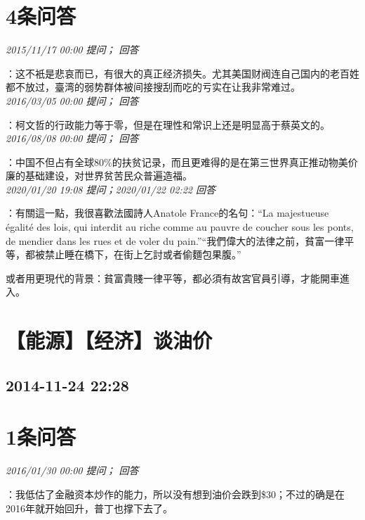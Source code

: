\documentclass[twocolumn]{ctexart}
\begin{document}
\section{4条问答}

\textit{\hfill\noindent\small 2015/11/17 00:00 提问； 回答}

：这不衹是悲哀而已，有很大的真正经济损失。尤其美国财阀连自己国内的老百姓都不放过，臺湾的弱势群体被间接搜刮而吃的亏实在让我非常难过。\\

\textit{\hfill\noindent\small 2016/03/05 00:00 提问； 回答}

：柯文哲的行政能力等于零，但是在理性和常识上还是明显高于蔡英文的。\\

\textit{\hfill\noindent\small 2016/08/08 00:00 提问； 回答}

：中国不但占有全球80\%的扶贫记录，而且更难得的是在第三世界真正推动物美价廉的基础建设，对世界贫苦民众普遍造福。\\

\textit{\hfill\noindent\small 2020/01/20 19:08 提问；2020/01/22 02:22 回答}

：有關這一點，我很喜歡法國詩人Anatole France的名句：“La majestueuse égalité des lois, qui interdit au riche comme au pauvre de coucher sous les ponts, de mendier dans les rues et de voler du pain.”“我們偉大的法律之前，貧富一律平等，都被禁止睡在橋下，在街上乞討或者偷麵包果腹。”

或者用更現代的背景：貧富貴賤一律平等，都必須有故宮官員引導，才能開車進入。
\\


\section{【能源】【经济】谈油价}
\subsection{2014-11-24 22:28}


\section{1条问答}

\textit{\hfill\noindent\small 2016/01/30 00:00 提问； 回答}

：我低估了金融资本炒作的能力，所以没有想到油价会跌到\$30；不过的确是在2016年就开始回升，普丁也撑下去了。\\
\end{document}
